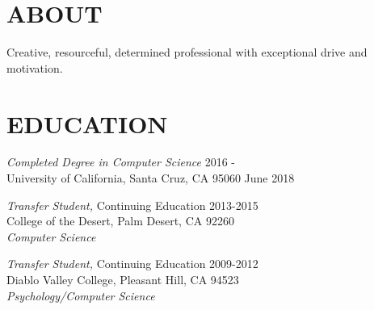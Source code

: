 \documentclass[line,margin]{res}
\begin{document}
\address{12345  Street Name, Bay Area, CA 94596}
\address{(555) 555-5555 or jvrionis@ucsc.edu}

\begin{resume}

\section{ABOUT} Creative, resourceful, determined professional with 
exceptional drive and \\
 motivation. 

\section{EDUCATION} {\sl Completed Degree in Computer Science } 
                        \hfill 2016 -\\ 
                    University of California, Santa Cruz, CA 95060
                        \hfill June 2018 

                    {\sl Transfer Student,} Continuing Education 
                        \hfill 2013-2015\\
                    College of the Desert, Palm Desert, CA 92260\\                
                    \textit{Computer Science} %
                
                    {\sl Transfer Student,} Continuing Education 
                        \hfill 2009-2012\\
                    Diablo Valley College, Pleasant Hill, CA 94523\\
                    \textit{Psychology/Computer Science} %
 


\end{resume}
\end{document}
